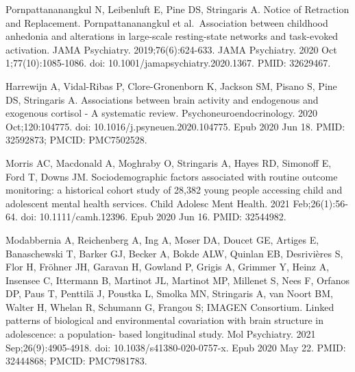 \documentclass[
]{article}
\begin{document}
Pornpattananangkul N, Leibenluft E, Pine DS, Stringaris A. Notice of
Retraction and Replacement. Pornpattananangkul et al.~Association
between childhood anhedonia and alterations in large-scale resting-state
networks and task-evoked activation. JAMA Psychiatry.
2019;76(6):624-633. JAMA Psychiatry. 2020 Oct 1;77(10):1085-1086. doi:
10.1001/jamapsychiatry.2020.1367. PMID: 32629467.

Harrewijn A, Vidal-Ribas P, Clore-Gronenborn K, Jackson SM, Pisano S,
Pine DS, Stringaris A. Associations between brain activity and
endogenous and exogenous cortisol - A systematic review.
Psychoneuroendocrinology. 2020 Oct;120:104775. doi:
10.1016/j.psyneuen.2020.104775. Epub 2020 Jun 18. PMID: 32592873; PMCID:
PMC7502528.

Morris AC, Macdonald A, Moghraby O, Stringaris A, Hayes RD, Simonoff E,
Ford T, Downs JM. Sociodemographic factors associated with routine
outcome monitoring: a historical cohort study of 28,382 young people
accessing child and adolescent mental health services. Child Adolesc
Ment Health. 2021 Feb;26(1):56-64. doi: 10.1111/camh.12396. Epub 2020
Jun 16. PMID: 32544982.

Modabbernia A, Reichenberg A, Ing A, Moser DA, Doucet GE, Artiges E,
Banaschewski T, Barker GJ, Becker A, Bokde ALW, Quinlan EB, Desrivières
S, Flor H, Fröhner JH, Garavan H, Gowland P, Grigis A, Grimmer Y, Heinz
A, Insensee C, Ittermann B, Martinot JL, Martinot MP, Millenet S, Nees
F, Orfanos DP, Paus T, Penttilä J, Poustka L, Smolka MN, Stringaris A,
van Noort BM, Walter H, Whelan R, Schumann G, Frangou S; IMAGEN
Consortium. Linked patterns of biological and environmental covariation
with brain structure in adolescence: a population- based longitudinal
study. Mol Psychiatry. 2021 Sep;26(9):4905-4918. doi:
10.1038/s41380-020-0757-x. Epub 2020 May 22. PMID: 32444868; PMCID:
PMC7981783.
\end{document}
